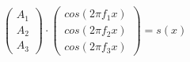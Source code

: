 $ \begin{pmatrix} A_1 \\ A_2 \\ A_3 \end{pmatrix} \cdot \begin{pmatrix} cos(2\pi f_1 x) \\ cos(2\pi f_2 x) \\ cos(2\pi f_3 x) \end{pmatrix} = s(x)$
